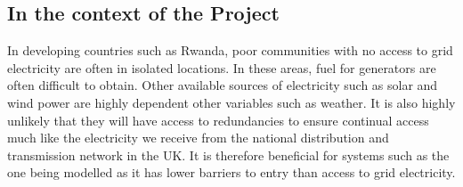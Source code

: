 \subsection*{In the context of the Project}
In developing countries such as Rwanda, poor communities with no access to grid electricity are often in isolated locations. In these areas, fuel for generators are often difficult to obtain. Other available sources of electricity such as solar and wind power are highly dependent other variables such as weather. It is also highly unlikely that they will have access to redundancies to ensure continual access much like the electricity we receive from the national distribution and transmission network in the UK. It is therefore beneficial for systems such as the one being modelled as it has lower barriers to entry than access to grid electricity.



